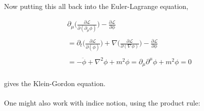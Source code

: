 \documentclass[aps,secnumarabic,nobalancelastpage,amsmath,amssymb,
nofootinbib]{revtex4}
\newcommand{\Lagr}{\mathcal{L}}
\begin{document}

\noindent Now putting this all back into the Euler-Lagrange equation,

\begin{equation}
\begin{split}
 \partial_\mu \bigg(\frac{ \partial \Lagr}{ \partial (\partial_\mu \phi) }\bigg)-\frac{ \partial \Lagr}{ \partial \phi} \\
\\
=  \partial_t \bigg(\frac{ \partial \Lagr}{ \partial ( \dot{\phi}) }\bigg) + \nabla \bigg(\frac{ \partial \Lagr}{ \partial ( \nabla\phi) }\bigg) - \frac{ \partial \Lagr}{ \partial \phi}\\
\\
= -\ddot{\phi}+\nabla^2\phi +m^2\phi=  \partial_\mu \partial^\mu \phi + m^2\phi =0
\, \label{eq:16}
\end{split}
\end{equation}
\\
\noindent gives the Klein-Gordon equation.
\\
\\
\noindent One might also work with indice notion, using the product rule:
\end{document}
